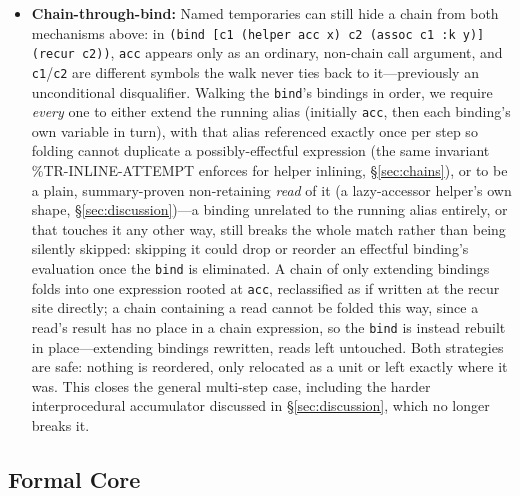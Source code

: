 \documentclass[sigplan,review,anonymous]{acmart}
\begin{document}
\begin{itemize}
    \item \textbf{Chain-through-bind:} Named temporaries can still hide a chain from both mechanisms above: in \texttt{(bind [c1 (helper acc x) c2 (assoc c1 :k y)] (recur c2))}, \texttt{acc} appears only as an ordinary, non-chain call argument, and \texttt{c1}/\texttt{c2} are different symbols the walk never ties back to it---previously an unconditional disqualifier. Walking the \texttt{bind}'s bindings in order, we require \emph{every} one to either extend the running alias (initially \texttt{acc}, then each binding's own variable in turn), with that alias referenced exactly once per step so folding cannot duplicate a possibly-effectful expression (the same invariant \%TR-INLINE-ATTEMPT enforces for helper inlining, §\ref{sec:chains}), or to be a plain, summary-proven non-retaining \emph{read} of it (a lazy-accessor helper's own shape, §\ref{sec:discussion})---a binding unrelated to the running alias entirely, or that touches it any other way, still breaks the whole match rather than being silently skipped: skipping it could drop or reorder an effectful binding's evaluation once the \texttt{bind} is eliminated. A chain of only extending bindings folds into one expression rooted at \texttt{acc}, reclassified as if written at the recur site directly; a chain containing a read cannot be folded this way, since a read's result has no place in a chain expression, so the \texttt{bind} is instead rebuilt in place---extending bindings rewritten, reads left untouched. Both strategies are safe: nothing is reordered, only relocated as a unit or left exactly where it was. This closes the general multi-step case, including the harder interprocedural accumulator discussed in §\ref{sec:discussion}, which no longer breaks it.
\end{itemize}

\subsection{Formal Core}
\label{sec:formal}
\end{document}
